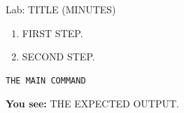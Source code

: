 \begin{frame}[fragile]{Lab: TITLE (MINUTES)}
  \begin{enumerate}
    \item FIRST STEP.
    \item SECOND STEP.
  \end{enumerate}
  \begin{lstlisting}[style=shell]
THE MAIN COMMAND
  \end{lstlisting}
  \textbf{You see:} THE EXPECTED OUTPUT.
\end{frame}

